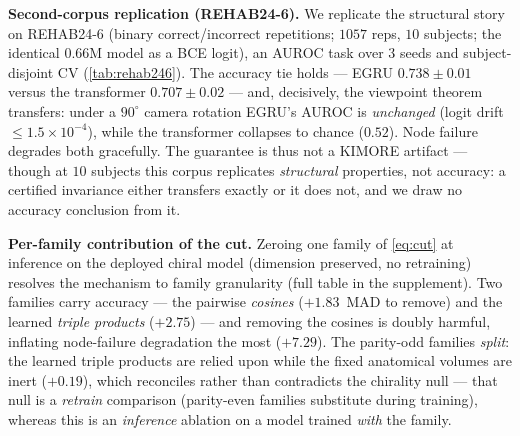 \documentclass[10pt,twocolumn,letterpaper]{article}
\begin{document}
\textbf{Second-corpus replication (REHAB24-6).} We replicate the structural story on REHAB24-6
(binary correct/incorrect repetitions; $1057$ reps, $10$ subjects; the
identical $0.66$M model as a BCE logit), an AUROC task over $3$ seeds and subject-disjoint CV
(\cref{tab:rehab246}). The accuracy tie holds --- EGRU $0.738\pm0.01$ versus the transformer
$0.707\pm0.02$ --- and, decisively, the viewpoint theorem transfers: under a $90^\circ$ camera rotation
EGRU's AUROC is \emph{unchanged} (logit drift $\le1.5\times10^{-4}$), while the transformer collapses to
chance ($0.52$). Node failure degrades both gracefully. The guarantee is thus not a KIMORE artifact ---
though at $10$ subjects this corpus replicates \emph{structural} properties, not accuracy: a certified
invariance either transfers exactly or it does not, and we draw no accuracy conclusion from it.

\begin{table}[t]\centering\small
\caption{REHAB24-6 second-corpus replication ($3$ seeds, subject-disjoint CV). AUROC@$90^\circ$ is the
same model evaluated under a $90^\circ$ camera rotation: EGRU is invariant by theorem (logit drift
$\le1.5\times10^{-4}$); the transformer falls to chance (drift $23.2$). Node-fail: AUROC lost over $8$
frozen nodes. The two models \emph{cross} between $2$ and $4$ frozen joints; full curve and fold-level
spread in the supplement.}
\label{tab:rehab246}
\end{table}

\textbf{Per-family contribution of the cut.} Zeroing one family of \cref{eq:cut} at inference on the
deployed chiral model (dimension preserved, no retraining) resolves the mechanism to family
granularity (full table in the supplement). Two families carry accuracy --- the pairwise \emph{cosines}
($+1.83$~MAD to remove) and the learned \emph{triple products} ($+2.75$) --- and removing the cosines
is doubly harmful, inflating node-failure degradation the most ($+7.29$). The parity-odd families
\emph{split}: the learned triple products are relied upon while the fixed anatomical volumes are inert
($+0.19$), which reconciles rather than contradicts the chirality null --- that null is a \emph{retrain}
comparison (parity-even families substitute during training), whereas this is an \emph{inference}
ablation on a model trained \emph{with} the family.
\end{document}
